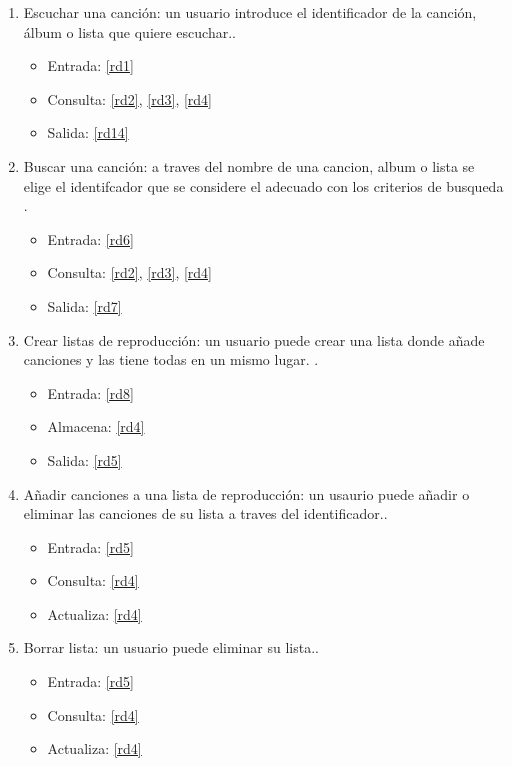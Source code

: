 \documentclass[12pt,a4paper]{article}
\begin{document}
\begin{enumerate}[label=\textnormal{RF\arabic*.}]


    \item Escuchar una canción: un usuario introduce el identificador de la canción, álbum o lista que quiere escuchar.\label{rf1}.
    	\begin{itemize}
			\item Entrada: \ref{rd1}
			\item Consulta: \ref{rd2}, \ref{rd3}, \ref{rd4} 
			\item Salida: \ref{rd14}
		\end{itemize}
		
	 \item Buscar una canción: a traves del nombre de una cancion, album o lista se elige el identifcador que se considere el adecuado con los criterios de busqueda \label{rf2}.
    	\begin{itemize}
			\item Entrada: \ref{rd6}
			\item Consulta: \ref{rd2}, \ref{rd3}, \ref{rd4} 
			\item Salida: \ref{rd7}
		\end{itemize}

	 \item Crear listas de reproducción: un usuario puede crear una lista donde añade canciones y las tiene todas en un mismo lugar. \label{rf3}.
    	\begin{itemize}
			\item Entrada: \ref{rd8}
			\item Almacena: \ref{rd4}
			\item Salida: \ref{rd5}
		\end{itemize}

	 \item Añadir canciones a una lista de reproducción: un usaurio puede añadir o eliminar las canciones de su lista a traves del identificador.\label{rf4}.
    	\begin{itemize}
			\item Entrada: \ref{rd5}
			\item Consulta: \ref{rd4}
			\item Actualiza: \ref{rd4}
		\end{itemize}

	 \item Borrar lista: un usuario puede eliminar su lista.\label{rf5}.
    	\begin{itemize}
			\item Entrada: \ref{rd5}
			\item Consulta: \ref{rd4}
			\item Actualiza: \ref{rd4}
		\end{itemize}
		

\end{enumerate}
\end{document}

